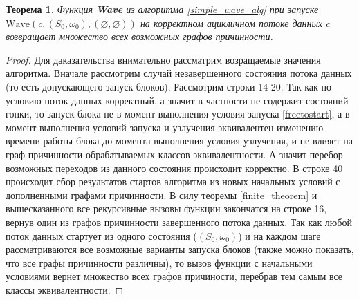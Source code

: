 \documentclass[10pt,a4paper]{article}
\newtheorem{theorem}{Теорема}
\begin{document}
  \begin{theorem}
    Функция \textbf{Wave} из алгоритма \ref{simple_wave_alg} при запуске $\text{Wave}(c, (S_0, \omega_0), (\varnothing, \varnothing))$ на корректном
    ацикличном потоке данных $c$ возвращает множество всех возможных графов причинности.
  \end{theorem}
  \begin{proof}
    Для даказательства внимательно рассматрим возращаемые значения алгоритма. Вначале рассмотрим случай незавершенного состояния
    потока данных (то есть допускающего запуск блоков).
    Рассмотрим строки 14-20. Так как по условию поток данных корректный, а значит в частности не содержит состояний гонки, то запуск блока не в момент
    выполнения условия запуска \ref{freetostart}, а в момент выполнения условий запуска и узлучения эквивалентен изменению времени работы блока до момента
    выполнения условия узлучения, и не влияет на граф причинности обрабатываемых классов эквивалентности. А значит перебор возможных переходов из данного состояния
    происходит корректно.
    В строке 40 происходит сбор результатов стартов алгоритма из новых начальных условий с дополненными графами причинности.
    В силу теоремы \ref{finite_theorem} и вышесказанного все рекурсивные вызовы функции закончатся на строке 16, вернув один из графов причинности
    завершенного потока данных.
    Так как любой поток данных стартует из одного состояния ($(S_0, \omega_0)$) и на каждом шаге рассматриваются все возможные варианты запуска блоков
    (также можно показать, что все графы причинности различны), то вызов функции с начальными условиями вернет множество всех графов причиности, перебрав
    тем самым все классы эквивалентности.
  \end{proof}
  
\end{document}

